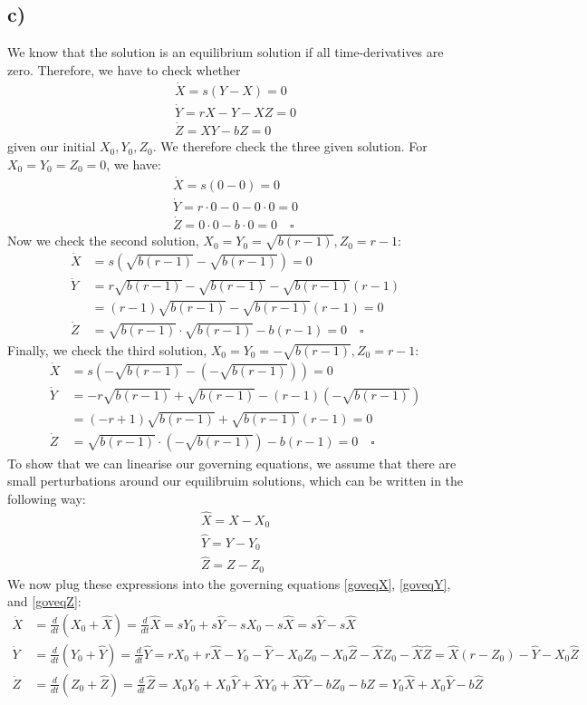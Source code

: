 \documentclass{article}
\begin{document}
\subsection*{c)}
We know that the solution is an equilibrium solution if all time-derivatives are zero. Therefore, we have to check whether 
\begin{align}
    \dot X=s(Y-X)=0 \label{goveqX}\\
    \dot Y=rX-Y-XZ=0 \label{goveqY}\\
    \dot Z=XY-bZ=0 \label{goveqZ}
\end{align}
given our initial $X_0,Y_0,Z_0$. We therefore check the three given solution. For $X_0=Y_0=Z_0=0$, we have:
\begin{align*}
    \dot X=s(0-0)=0\\
    \dot Y=r\cdot 0-0-0\cdot 0=0\\
    \dot Z=0\cdot 0-b \cdot 0=0 \quad \square
\end{align*}
Now we check the second solution, $X_0=Y_0=\sqrt{b(r-1)},Z_0=r-1$:
\begin{align*}
    \dot X&=s(\sqrt{b(r-1)}-\sqrt{b(r-1)})=0\\
    \dot Y&=r\sqrt{b(r-1)}-\sqrt{b(r-1)}-\sqrt{b(r-1)}(r-1)\\
    &=(r-1)\sqrt{b(r-1)}-\sqrt{b(r-1)}(r-1)=0\\
    \dot Z&=\sqrt{b(r-1)}\cdot \sqrt{b(r-1)}-b(r-1)=0 \quad \square
\end{align*}
Finally, we check the third solution, $X_0=Y_0=-\sqrt{b(r-1)},Z_0=r-1$:
\begin{align*}
    \dot X&=s(-\sqrt{b(r-1)}-(-\sqrt{b(r-1)}))=0\\
    \dot Y&=-r\sqrt{b(r-1)}+\sqrt{b(r-1)}-(r-1)(-\sqrt{b(r-1)})\\
    &=(-r+1)\sqrt{b(r-1)}+\sqrt{b(r-1)}(r-1)=0\\
    \dot Z&=\sqrt{b(r-1)}\cdot (-\sqrt{b(r-1)})-b(r-1)=0 \quad \square
\end{align*}
To show that we can linearise our governing equations, we assume that there are small perturbations around our equilibruim solutions, which can be written in the following way: 
\begin{align*}
    \hat{X} = X - X_0 \\
    \hat{Y} = Y - Y_0 \\
    \hat{Z} = Z - Z_0
\end{align*}
We now plug these expressions into the governing equations \ref{goveqX}, \ref{goveqY}, and \ref{goveqZ}:
\begin{align*}
    \dot{X} &= \frac{d}{dt} (X_0 + \hat{X}) = \frac{d}{dt} \hat{X} = sY_0 + s\hat{Y} - sX_0 - s\hat{X} = s\hat{Y} - s\hat{X} \\
    \dot{Y} &= \frac{d}{dt} (Y_0 + \hat{Y}) = \frac{d}{dt} \hat{Y} = rX_0 + r\hat{X} - Y_0 - \hat{Y} - X_0Z_0 - X_0\hat{Z} - \hat{X}Z_0 - \hat{X}\hat{Z} = \hat{X}(r - Z_0)- \hat{Y} - X_0\hat{Z} \\
    \dot{Z} &= \frac{d}{dt} (Z_0 + \hat{Z}) = \frac{d}{dt} \hat{Z} = X_0Y_0 + X_0\hat{Y} + \hat{X}Y_0 + \hat{X}\hat{Y} - bZ_0 - b\hat{Z} = Y_0\hat{X} + X_0\hat{Y} - b\hat{Z}
\end{align*}
\end{document}
